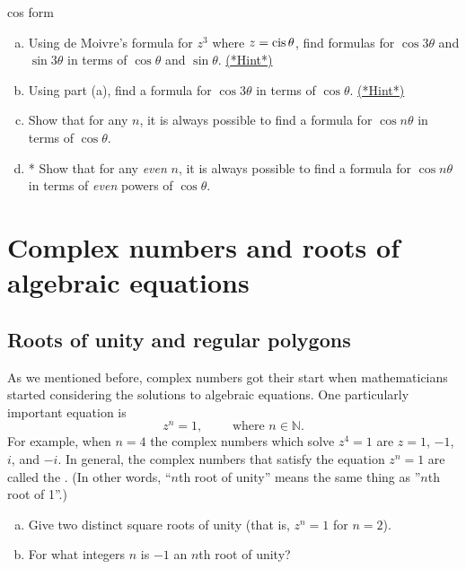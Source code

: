 \begin{exercise}{cos form}
\begin{enumerate}[(a)]
 \item
Using de Moivre's formula for $z^3$ where $z =  \operatorname{cis} \theta$, find formulas for $\cos 3 \theta$ and $\sin 3 \theta$ in terms of $\cos \theta$ and $\sin \theta$. \hyperref[sec:complex:hints]{(*Hint*)}
\item
Using part (a), find a formula for $\cos 3 \theta$ in terms of $\cos \theta$.  
\hyperref[sec:complex:hints]{(*Hint*)}
\item
Show that for any $n$, it is always possible to find a formula for $\cos n\theta$ in terms of $\cos \theta$.
\item
* Show that for any \emph{even} $n$, it is always possible to find a formula for $\cos n\theta$ in terms of \emph{even} powers of $\cos \theta$.
\end{enumerate}
\end{exercise}


\section{Complex numbers and roots of algebraic equations}
\label{sec:ComplexNumbers:ComplexRoots}

\subsection{Roots of unity and regular polygons\quad{}}\label{sec:RootsOfUnity}
As we mentioned before, complex numbers got their start when mathematicians started considering the solutions to algebraic  equations. One particularly important equation is
\[z^{n}=1, \qquad \text{ where } n \in \mathbb{N}.\]
For example, when $n=4$ the complex numbers which solve $z^4=1$ are $z=1$, $-1$, $i$, and $-i$. In general, the complex numbers that satisfy the
equation $z^{n}=1$ are called the . (In other words, ``$n$th root of unity'' means the same thing as ''$n$th root of 1''.)

\begin{exercise}{48}
\begin{enumerate}[(a)]
\item
Give two distinct square roots of unity (that is, $z^n = 1$ for $n=2$).
\item
For what integers $n$ is $-1$ an $n$th root of unity?
\end{enumerate}
\end{exercise}

